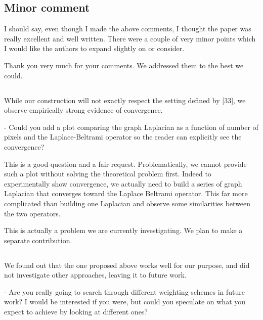 \documentclass[12pt,a4paper]{article}
\newcommand{\nati}[1]{{\color[rgb]{.1,.6,.1}{NP: #1}}}
\newcommand{\1}{\b{1}}              %
\newcommand{\0}{\b{0}}              %
\begin{document}
\nati{
Technically, testing this is complicated as rotation on HEALPix are complicated and expensive. We probably will have to break a lot of code to do it.

@Michael: what do you think?
}

\subsection*{Minor comment}

\begin{mdframed}[style=comment]
I should say, even though I made the above comments, I thought the paper was really excellent and well written. There were a couple of very minor points which I would like the authors to expand slightly on or consider.
\end{mdframed}
Thank you very much for your comments. We addressed them to the best we could.

\subsection{}
\begin{mdframed}[style=comment]
While our construction will not exactly respect the setting defined by [33], we observe empirically strong evidence of convergence.

- Could you add a plot comparing the graph Laplacian as a function of number of pixels and the Laplace-Beltrami operator so the reader can explicitly see the convergence?
\end{mdframed}

This is a good question and a fair request. Problematically, we cannot provide such a plot without solving the theoretical problem first. Indeed to experimentally show convergence, we actually need to build a series of graph Laplacian that converges toward the Laplace Beltrami operator. This far more complicated than building one Laplacian and observe some similarities between the two operators.

This is actually a problem we are currently investigating. We plan to make a separate contribution.


\subsection{}

\begin{mdframed}[style=comment]
We found out that the one proposed above works well for our purpose, and did not investigate other approaches, leaving it to future work.

- Are you really going to search through different weighting schemes in future work? I would be interested if you were, but could you speculate on what you expect to achieve by looking at different ones?
\end{mdframed}
\end{document}
